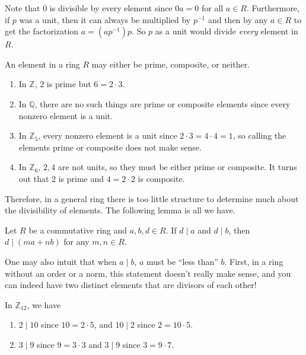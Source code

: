   Note that $0$ is divisible by every element since $0a = 0$ for all $a \in R$. Furthermore, if $p$ was a unit, then it can always be multiplied by $p^{-1}$ and then by any $a \in R$ to get the factorization $a = (a p^{-1}) p$. So $p$ as a unit would divide \textit{every} element in $R$. 

  \begin{example}
    \label{ex:prime-and-composite-elements}
    An element in a ring $R$ may either be prime, composite, or neither. 
    \begin{enumerate}
      \item In $\mathbb{Z}$, $2$ is prime but $6 = 2 \cdot 3$. 
      \item In $\mathbb{Q}$, there are no such things are prime or composite elements since every nonzero element is a unit. 
      \item In $\mathbb{Z}_5$, every nonzero element is a unit since $2 \cdot 3 = 4 \cdot 4 = 1$, so calling the elements prime or composite does not make sense. 
      \item In $\mathbb{Z}_6$, $2, 4$ are not units, so they must be either prime or composite. It turns out that $2$ is prime and $4 = 2 \cdot 2$ is composite. 
    \end{enumerate}
  \end{example}

  Therefore, in a general ring there is too little structure to determine much about the divisibility of elements. The following lemma is all we have. 

  \begin{lemma}
    \label{thm:divisibility-of-linear-combinations-of-rings}
    Let $R$ be a commutative ring and $a, b, d \in R$. If $d \mid a$ and $d \mid b$, then $d \mid (ma + nb)$ for any $m, n \in R$. 
  \end{lemma} 

  One may also intuit that when $a \mid b$, $a$ must be ``less than'' $b$. First, in a ring without an order or a norm, this statement doesn't really make sense, and you can indeed have two distinct elements that are divisors of each other! 

  \begin{example}
    \label{ex:two-distinct-elements-are-divisors-of-each-other}
    In $\mathbb{Z}_{12}$, we have 
    \begin{enumerate}
      \item $2 \mid 10$ since $10 = 2 \cdot 5$, and $10 \mid 2$ since $2 = 10 \cdot 5$. 
      \item $3 \mid 9$ since $9 = 3 \cdot 3$ and $3 \mid 9$ since $3 = 9 \cdot 7$. 
    \end{enumerate}
  \end{example}


